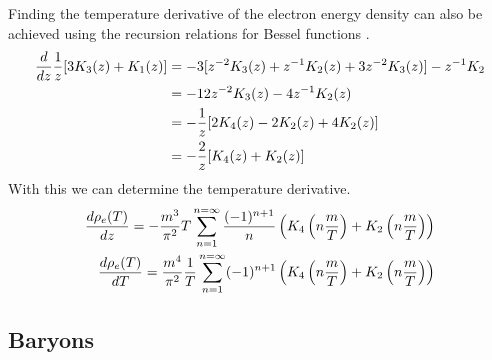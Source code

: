 Finding the temperature derivative of the electron energy density can also be achieved using the recursion relations for Bessel functions \cite[\href{https://dlmf.nist.gov/10.29.E2}{(10.29.2)}]{NIST:DLMF}.
\begin{align}
    \frac{d}{dz} \frac{1}{z}[3K_{3}(z)+K_{1}(z)]&=-3[z^{-2} K_{3}(z)+z^{-1} K_{2}(z)+ 3z^{-2} K_{3}(z)]-z^{-1} K_{2}\\
    &=-12 z^{-2} K_{3}(z)-4z^{-1} K_{2}(z)\\
    &=-\frac{1}{z}[2K_{4}(z)-2K_{2}(z)+4 K_{2}(z)]\\
    &=-\frac{2}{z}[K_{4}(z)+K_{2}(z)]
\end{align}
With this we can determine the temperature derivative.
\begin{align}
    \frac{d\rho_e(T)}{dz}=-\frac{m^3}{\pi^2} T \sum_{n=1}^{n=\infty} \frac{(-1)^{n+1}}{n}  \left(K_4\left(n\frac{m }{T}\right) + K_2\left(n\frac{m }{T}\right) \right)\\
    \frac{d\rho_e(T)}{dT}=\frac{m^4}{\pi^2} \frac{1}{T} \sum_{n=1}^{n=\infty} (-1)^{n+1}   \left(K_4\left(n\frac{m }{T}\right) + K_2\left(n\frac{m }{T}\right) \right)
\end{align}


\subsection{Baryons}





